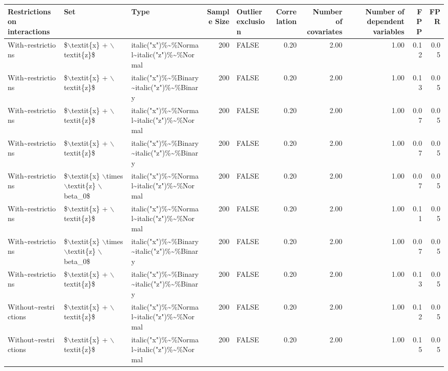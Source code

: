 \begin{table}[ht]
\centering
\begin{tabular}{lllrlrrrrr}
  \hline
Restrictions on interactions & Set & Type & Sample Size & Outlier exclusion & Correlation & Number of covariates & Number of dependent variables & FPP & FPR \\ 
  \hline
With\~{}restrictions & \$$\backslash$textit\{x\} + $\backslash$textit\{z\}\$ & italic("x")\%\~{}\%Normal\~{}italic("z")\%\~{}\%Normal & 200 & FALSE & 0.20 & 2.00 & 1.00 & 0.12 & 0.05 \\ 
  With\~{}restrictions & \$$\backslash$textit\{x\} + $\backslash$textit\{z\}\$ & italic("x")\%\~{}\%Binary\~{}italic("z")\%\~{}\%Binary & 200 & FALSE & 0.20 & 2.00 & 1.00 & 0.13 & 0.05 \\ 
  With\~{}restrictions & \$$\backslash$textit\{x\} + $\backslash$textit\{z\}\$ & italic("x")\%\~{}\%Normal\~{}italic("z")\%\~{}\%Normal & 200 & FALSE & 0.20 & 2.00 & 1.00 & 0.07 & 0.05 \\ 
  With\~{}restrictions & \$$\backslash$textit\{x\} + $\backslash$textit\{z\}\$ & italic("x")\%\~{}\%Binary\~{}italic("z")\%\~{}\%Binary & 200 & FALSE & 0.20 & 2.00 & 1.00 & 0.07 & 0.05 \\ 
  With\~{}restrictions & \$$\backslash$textit\{x\} $\backslash$times $\backslash$textit\{z\} $\backslash$beta\_0\$ & italic("x")\%\~{}\%Normal\~{}italic("z")\%\~{}\%Normal & 200 & FALSE & 0.20 & 2.00 & 1.00 & 0.07 & 0.05 \\ 
  With\~{}restrictions & \$$\backslash$textit\{x\} + $\backslash$textit\{z\}\$ & italic("x")\%\~{}\%Normal\~{}italic("z")\%\~{}\%Normal & 200 & FALSE & 0.20 & 2.00 & 1.00 & 0.11 & 0.05 \\ 
  With\~{}restrictions & \$$\backslash$textit\{x\} $\backslash$times $\backslash$textit\{z\} $\backslash$beta\_0\$ & italic("x")\%\~{}\%Binary\~{}italic("z")\%\~{}\%Binary & 200 & FALSE & 0.20 & 2.00 & 1.00 & 0.07 & 0.05 \\ 
  With\~{}restrictions & \$$\backslash$textit\{x\} + $\backslash$textit\{z\}\$ & italic("x")\%\~{}\%Binary\~{}italic("z")\%\~{}\%Binary & 200 & FALSE & 0.20 & 2.00 & 1.00 & 0.13 & 0.05 \\ 
  Without\~{}restrictions & \$$\backslash$textit\{x\} + $\backslash$textit\{z\}\$ & italic("x")\%\~{}\%Normal\~{}italic("z")\%\~{}\%Normal & 200 & FALSE & 0.20 & 2.00 & 1.00 & 0.12 & 0.05 \\ 
  Without\~{}restrictions & \$$\backslash$textit\{x\} + $\backslash$textit\{z\}\$ & italic("x")\%\~{}\%Normal\~{}italic("z")\%\~{}\%Normal & 200 & FALSE & 0.20 & 2.00 & 1.00 & 0.15 & 0.05 \\ 

\end{tabular}
\end{table}
